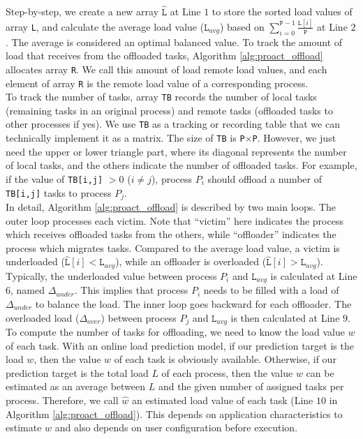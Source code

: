 Step-by-step, we create a new array $\hat{\texttt{L}}$ at Line $1$ to store the sorted load values of array \texttt{L}, and calculate the average load value ($\texttt{L}_{avg}$) based on $\sum_{i=0}^{\texttt{P}-1}\frac{\texttt{L}[i]}{\texttt{P}}$ at Line $2$. The average is considered an optimal balanced value. To track the amount of load that receives from the offloaded tasks, Algorithm \ref{alg:proact_offload} allocates array \texttt{R}. We call this amount of load remote load values, and each element of array \texttt{R} is the remote load value of a corresponding process.\\

To track the number of tasks, array \texttt{TB} records the number of local tasks (remaining tasks in an original process) and remote tasks (offloaded tasks to other processes if yes). We use \texttt{TB} as a tracking or recording table that we can technically implement it as a matrix. The size of \texttt{TB} is \texttt{P}$\times$\texttt{P}. However, we just need the upper or lower triangle part, where its diagonal represents the number of local tasks, and the others indicate the number of offloaded tasks. For example, if the value of \texttt{TB[i,j]} $> 0$ ($i \neq j$), process $P_{i}$ should offload a number of \texttt{TB[i,j]} tasks to process $P_{j}$.\\

In detail, Algorithm \ref{alg:proact_offload} is described by two main loops. The outer loop processes each victim. Note that ``victim'' here indicates the process which receives offloaded tasks from the others, while ``offloader'' indicates the process which migrates tasks. Compared to the average load value, a victim is underloaded ($\hat{\texttt{L}}[i] < \texttt{L}_{avg}$), while an offloader is overloaded ($\hat{\texttt{L}}[i] > \texttt{L}_{avg}$). Typically, the underloaded value between process $P_{i}$ and $\texttt{L}_{avg}$ is calculated at Line $6$, named $\Delta_{under}$. This implies that process $P_{i}$ needs to be filled with a load of $\Delta_{under}$ to balance the load. The inner loop goes backward for each offloader. The overloaded load ($\Delta_{over}$) between process $P_{j}$ and $\texttt{L}_{avg}$ is then calculated at Line $9$.\\

To compute the number of tasks for offloading, we need to know the load value $w$ of each task. With an online load prediction model, if our prediction target is the load $w$, then the value $w$ of each task is obviously available. Otherwise, if our prediction target is the total load $L$ of each process, then the value $w$ can be estimated as an average between $L$ and the given number of assigned tasks per process. Therefore, we call $\hat{w}$ an estimated load value of each task (Line $10$ in Algorithm \ref{alg:proact_offload}). This depends on application characteristics to estimate $w$ and also depends on user configuration before execution.\\


